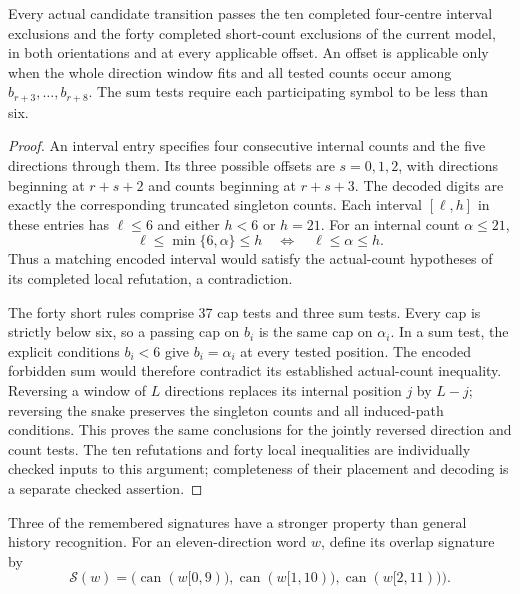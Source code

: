 \begin{proposition}\label{prop:local-filter-retention}
Every actual candidate transition passes the ten completed four-centre
interval exclusions and the forty completed short-count exclusions of the
current model, in both orientations and at every applicable offset.
An offset is applicable only when the whole direction window fits and all
tested counts occur among $b_{r+3},\ldots,b_{r+8}$. The sum tests require
each participating symbol to be less than six.
\end{proposition}
\begin{proof}
An interval entry specifies four consecutive internal counts and the five
directions through them. Its three possible offsets are $s=0,1,2$, with
directions beginning at $r+s+2$ and counts beginning at $r+s+3$. The decoded
digits are exactly the corresponding truncated singleton counts. Each
interval $[\ell,h]$ in these entries has $\ell\le6$ and either $h<6$ or
$h=21$. For an internal count $\alpha\le21$,
\[
\ell\le\min\{6,\alpha\}\le h
\quad\Longleftrightarrow\quad
\ell\le\alpha\le h.
\]
Thus a matching encoded interval would satisfy the actual-count hypotheses
of its completed local refutation, a contradiction.

The forty short rules comprise 37 cap tests and three sum tests. Every cap
is strictly below six, so a passing cap on $b_i$ is the same cap on
$\alpha_i$. In a sum test, the explicit conditions $b_i<6$ give
$b_i=\alpha_i$ at every tested position. The encoded forbidden sum would
therefore contradict its established actual-count inequality. Reversing a
window of $L$ directions replaces its internal position $j$ by $L-j$;
reversing the snake preserves the singleton counts and all induced-path
conditions. This proves the same conclusions for the jointly reversed
direction and count tests. The ten refutations and forty local inequalities
are individually checked inputs to this argument; completeness of their
placement and decoding is a separate checked assertion.
\end{proof}

Three of the remembered signatures have a stronger property than general
history recognition. For an eleven-direction word $w$, define its overlap
signature by
\[
\mathcal S(w)=\bigl(\operatorname{can}(w[0,9)),
\operatorname{can}(w[1,10)),\operatorname{can}(w[2,11))\bigr).
\]

